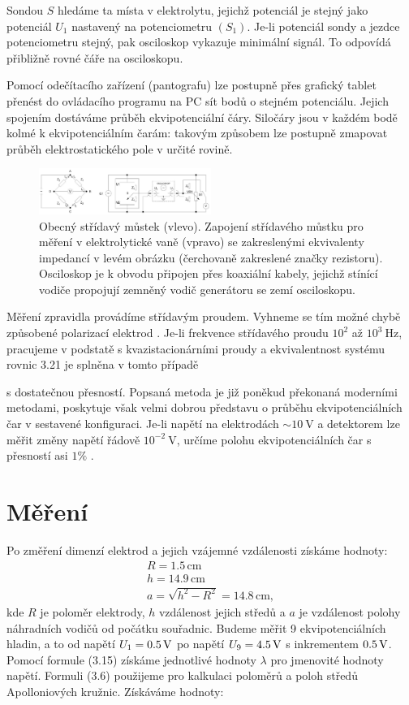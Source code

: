 \documentclass[czech,11pt,a4paper]{article}
\begin{document}
\begin{multicols}{2}
	Sondou $S$ hledáme ta místa v elektrolytu, jejichž potenciál je stejný jako potenciál $U_{1}$ nastavený na potenciometru $\left(S_{1}\right)$. Je-li potenciál sondy a jezdce potenciometru stejný, pak osciloskop vykazuje minimální signál. To odpovídá přibližně rovné čáře na osciloskopu.
	
	Pomocí odečítacího zařízení (pantografu) lze postupně přes grafický tablet přenést do ovládacího programu na PC sít bodů o stejném potenciálu. Jejich spojením dostáváme průběh ekvipotenciální čáry. Siločáry jsou v každém bodě kolmé k ekvipotenciálním čarám: takovým způsobem lze postupně zmapovat průběh elektrostatického pole v určité rovině.\\
	\begin{figure}[H]
		\includegraphics[max width=0.5\textwidth, center]{2024_10_15_71c3161fc9161f95056eg-5}
		\caption{Obecný střídavý můstek (vlevo). Zapojení střídavého můstku pro měření v elektrolytické vaně (vpravo) se zakreslenými ekvivalenty impedancí v levém obrázku (čerchovaně zakreslené značky rezistoru). Osciloskop je k obvodu připojen přes koaxiální kabely, jejichž stínící vodiče propojují zemněný vodič generátoru se zemí osciloskopu.}
	\end{figure}
	
	Měření zpravidla provádíme střídavým proudem. Vyhneme se tím možné chybě způsobené polarizací elektrod . Je-li frekvence střídavého proudu $10^{2}$ až $10^{3} \mathrm{~Hz}$, pracujeme v podstatě s kvazistacionárními proudy a ekvivalentnost systému rovnic 3.21 je splněna v tomto případě
	

	s dostatečnou přesností. Popsaná metoda je již poněkud překonaná moderními metodami, poskytuje však velmi dobrou představu o průběhu ekvipotenciálních čar v sestavené konfiguraci. Je-li napětí na elektrodách $\sim 10 \mathrm{~V}$ a detektorem lze měřit změny napětí řádově $10^{-2} \mathrm{~V}$, určíme polohu ekvipotenciálních čar s přesností asi $1 \%$ .
	
	
	
	\section{Měření}
	Po změření dimenzí elektrod a jejich vzájemné vzdálenosti získáme hodnoty:
	\begin{gather*}
		R = 1.5\,\mathrm{cm} \\
		h = 14.9\,\mathrm{cm} \\
		a = \sqrt{h^2 - R^2} = 14.8\,\mathrm{cm},		
	\end{gather*}
	kde $R$ je poloměr elektrody, $h$ vzdálenost jejich středů a $a$ je vzdálenost polohy náhradních vodičů od počátku souřadnic. Budeme měřit 9 ekvipotenciálních hladin, a to od napětí $U_1 = 0.5 \,\rm V$ po napětí $U_9 = 4.5\,\rm V$ s inkrementem $0.5\,\rm V$. Pomocí formule (3.15) získáme jednotlivé hodnoty $\lambda$ pro jmenovité hodnoty napětí. 
	Formuli (3.6) použijeme pro kalkulaci poloměrů a poloh středů Apolloniových kružnic. Získáváme hodnoty:
	

\end{multicols}
\end{document}
